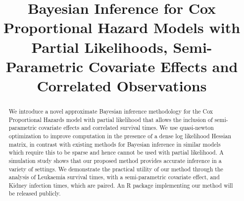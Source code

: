 \documentclass[ba]{imsart}
\begin{document}

\begin{frontmatter}
\title{Bayesian Inference for Cox Proportional Hazard Models with Partial Likelihoods, Semi-Parametric Covariate Effects and Correlated Observations}

\runtitle{}


\begin{abstract}
We introduce a novel approximate Bayesian inference methodology for the Cox Proportional Hazards model with partial likelihood that allows the inclusion of semi-parametric covariate effects and correlated survival times. We use quasi-newton optimization to improve computation in the presence of a dense log likelihood Hessian matrix, in contrast with existing methods for Bayesian inference in similar models which require this to be sparse and hence cannot be used with partial likelihood. A simulation study shows that our proposed method provides accurate inference in a variety of settings. We demonstrate the practical utility of our method through the analysis of Leukaemia survival times, with a semi-parametric covariate effect, and Kidney infection times, which are paired. An R package implementing our method will be released publicly.
\end{abstract}

\begin{keyword}
\end{keyword}

\end{frontmatter}


\end{document}
